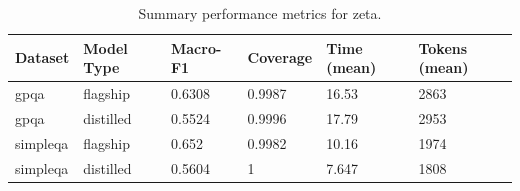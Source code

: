 \begin{table}[htbp]
\caption{Summary performance metrics for zeta.}
\label{tab:summaryperfuni}
\begin{tabular}{llllll}
\toprule
Dataset & Model Type & Macro-F1 & Coverage & Time (mean) & Tokens (mean) \\
\midrule
gpqa & flagship & 0.6308 & 0.9987 & 16.53 & 2863 \\
gpqa & distilled & 0.5524 & 0.9996 & 17.79 & 2953 \\
simpleqa & flagship & 0.652 & 0.9982 & 10.16 & 1974 \\
simpleqa & distilled & 0.5604 & 1 & 7.647 & 1808 \\
\bottomrule
\end{tabular}
\end{table}

